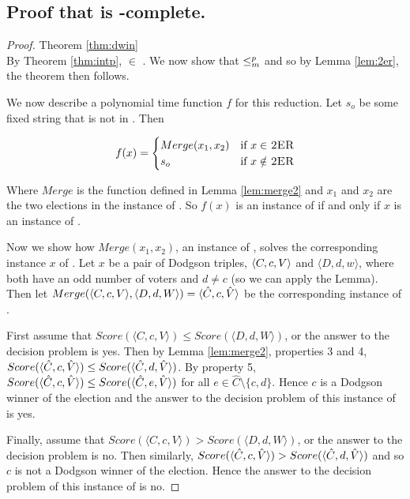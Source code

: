 \subsection{Proof that  is \tp-complete.}
\begin{proof}{Theorem \ref{thm:dwin}}\\
    By Theorem \ref{thm:intp}, \dwin $\in$ \tp.
    We now show that  $\le_m^p$ \dwin and so
    by Lemma \ref{lem:2er}, the theorem then follows.

    We now describe a polynomial time function $f$ for this reduction.
    Let $s_o$ be some fixed string that is not in \dwin.
    Then

    \[
      f(x) =
      \begin{cases}
          Merge(x_1,x_2) & \text{if $x \in$ {\sc 2ER}}  \\
          s_o & \text{if $x \notin$ {\sc 2ER}}
      \end{cases}
    \]

    Where $Merge$ is the function defined in Lemma \ref{lem:merge2} and
    $x_1$ and $x_2$ are the two elections in the instance of .
    So $f(x)$ is an instance of \dwin if and only if $x$ is an instance of
    .

    Now we show how $Merge(x_1,x_2)$, an instance of \dwin, solves the
    corresponding instance $x$ of .
    Let $x$ be a pair of Dodgson triples, $\langle C,c,V \rangle$ and
    $\langle D,d,w \rangle$, where both have an odd number of voters
    and $d \neq c$ (so we can apply the Lemma).
    Then let $Merge(\langle C,c,V \rangle, \langle D,d,W \rangle) =
    \langle \hat{C},c,\hat{V} \rangle$ be the corresponding instance of \dwin.

    First assume that $Score(\langle C,c,V \rangle)\leq Score(\langle D,d,W \rangle)$, or the
    answer to the  decision problem is yes.
    Then by Lemma \ref{lem:merge2}, properties 3 and 4,
    $Score(\langle \hat{C},c,\hat{V} \rangle) \leq Score(\langle \hat{C},d,\hat{V} \rangle)$.
    By property 5, $Score(\langle \hat{C},c,\hat{V} \rangle) \leq Score(\langle \hat{C},e,\hat{V} \rangle)$ for all
    $e \in \hat{C}\setminus \{c,d\}$.
    Hence $c$ is a Dodgson winner of the election and the answer
    to the decision problem of this instance of \dwin is yes.

    Finally, assume that $Score(\langle C,c,V \rangle)> Score(\langle D,d,W \rangle)$, or the
    answer to the  decision problem is no.
    Then similarly, $Score(\langle \hat{C},c,\hat{V} \rangle) > Score(\langle \hat{C},d,\hat{V} \rangle)$ and
    so $c$ is not a Dodgson winner of the election.
    Hence the answer to the decision problem of this instance of \dwin is
    no.

\end{proof}